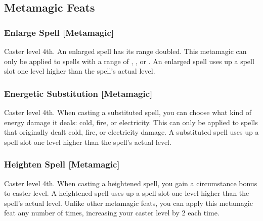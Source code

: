 \subsection{Metamagic Feats}


\subsubsection{Enlarge Spell [Metamagic]}
 Caster level 4th.
 An enlarged spell has its range doubled. This metamagic can only be applied to spells with a range of \rngclose, \rngmed, or \rnglong. An enlarged spell uses up a spell slot one level higher than the spell's actual level.

\begin{comment}
\subsubsection{Extend Spell [Metamagic]}
\parhead{Prerequisite} Caster level 8th.
\parhead{Benefit} An extended spell has its duration increased by one duration category: from Short, to Medium, to Long, to Extreme. This metamagic can only be applied to spells with a duration of \durshort, \durmed, or \durlong. An extended spell uses up a spell slot three levels higher than the spell's actual level.
\end{comment}

\subsubsection{Energetic Substitution [Metamagic]}
 Caster level 4th.
 When casting a substituted spell, you can choose what kind of energy damage it deals: cold, fire, or electricity. This can only be applied to spells that originally dealt cold, fire, or electricity damage. A substituted spell uses up a spell slot one level higher than the spell's actual level.

\subsubsection{Heighten Spell [Metamagic]}
 Caster level 4th.
 When casting a heightened spell, you gain a  circumstance bonus to caster level. A heightened spell uses up a spell slot one level higher than the spell's actual level. Unlike other metamagic feats, you can apply this metamagic feat any number of times, increasing your caster level by 2 each time.

